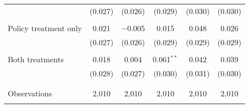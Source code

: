\begin{tabular}{@{\extracolsep{5pt}}lccccc}
  & (0.027) & (0.026) & (0.029) & (0.030) & (0.030) \\ 
  & & & & & \\ 
 Policy treatment only & 0.021 & $-$0.005 & 0.015 & 0.048 & 0.026 \\ 
  & (0.027) & (0.026) & (0.029) & (0.029) & (0.029) \\ 
  & & & & & \\ 
 Both treatments & 0.018 & 0.004 & 0.061$^{**}$ & 0.042 & 0.039 \\ 
  & (0.028) & (0.027) & (0.030) & (0.031) & (0.030) \\ 
  & & & & & \\ 
\hline \\[-1.8ex] 

Observations & 2,010 & 2,010 & 2,010 & 2,010 & 2,010 \\ 
\hline 
\hline \\[-1.8ex] 
\end{tabular} 